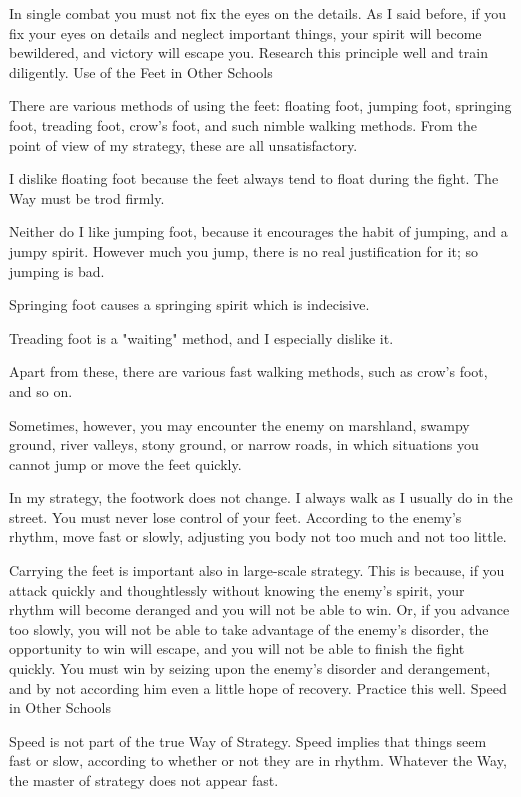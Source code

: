 In single combat you must not fix the eyes on the details. As I said before, if you fix your eyes on details and neglect important things, your spirit will become bewildered, and victory will escape you. Research this principle well and train diligently.
Use of the Feet in Other Schools

There are various methods of using the feet: floating foot, jumping foot, springing foot, treading foot, crow's foot, and such nimble walking methods. From the point of view of my strategy, these are all unsatisfactory.

I dislike floating foot because the feet always tend to float during the fight. The Way must be trod firmly.

Neither do I like jumping foot, because it encourages the habit of jumping, and a jumpy spirit. However much you jump, there is no real justification for it; so jumping is bad.

Springing foot causes a springing spirit which is indecisive.

Treading foot is a "waiting" method, and I especially dislike it.

Apart from these, there are various fast walking methods, such as crow's foot, and so on.

Sometimes, however, you may encounter the enemy on marshland, swampy ground, river valleys, stony ground, or narrow roads, in which situations you cannot jump or move the feet quickly.

In my strategy, the footwork does not change. I always walk as I usually do in the street. You must never lose control of your feet. According to the enemy's rhythm, move fast or slowly, adjusting you body not too much and not too little.

Carrying the feet is important also in large-scale strategy. This is because, if you attack quickly and thoughtlessly without knowing the enemy's spirit, your rhythm will become deranged and you will not be able to win. Or, if you advance too slowly, you will not be able to take advantage of the enemy's disorder, the opportunity to win will escape, and you will not be able to finish the fight quickly. You must win by seizing upon the enemy's disorder and derangement, and by not according him even a little hope of recovery. Practice this well.
Speed in Other Schools

Speed is not part of the true Way of Strategy. Speed implies that things seem fast or slow, according to whether or not they are in rhythm. Whatever the Way, the master of strategy does not appear fast.

